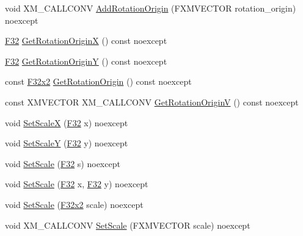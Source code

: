 \begin{DoxyCompactItemize}
\item 
void X\+M\+\_\+\+C\+A\+L\+L\+C\+O\+NV \mbox{\hyperlink{classmage_1_1_sprite_transform_a8f1ce16eb9c07a4f798e93bf58eb2b46}{Add\+Rotation\+Origin}} (F\+X\+M\+V\+E\+C\+T\+OR rotation\+\_\+origin) noexcept
\item 
\mbox{\hyperlink{namespacemage_aa97e833b45f06d60a0a9c4fc22ae02c0}{F32}} \mbox{\hyperlink{classmage_1_1_sprite_transform_a980beb77dc4b64a2d784361d61981f9c}{Get\+Rotation\+OriginX}} () const noexcept
\item 
\mbox{\hyperlink{namespacemage_aa97e833b45f06d60a0a9c4fc22ae02c0}{F32}} \mbox{\hyperlink{classmage_1_1_sprite_transform_a762326097353f1303eede1b716cb9f51}{Get\+Rotation\+OriginY}} () const noexcept
\item 
const \mbox{\hyperlink{namespacemage_a9dc0d34d6ecc87e4cfa4a826102117bc}{F32x2}} \mbox{\hyperlink{classmage_1_1_sprite_transform_a5c538636df465016643a370a9f820865}{Get\+Rotation\+Origin}} () const noexcept
\item 
const X\+M\+V\+E\+C\+T\+OR X\+M\+\_\+\+C\+A\+L\+L\+C\+O\+NV \mbox{\hyperlink{classmage_1_1_sprite_transform_a49349d65ad063a1519b6699087d9b790}{Get\+Rotation\+OriginV}} () const noexcept
\item 
void \mbox{\hyperlink{classmage_1_1_sprite_transform_a2e19b9bffce49955e57094b1eda6af52}{Set\+ScaleX}} (\mbox{\hyperlink{namespacemage_aa97e833b45f06d60a0a9c4fc22ae02c0}{F32}} x) noexcept
\item 
void \mbox{\hyperlink{classmage_1_1_sprite_transform_a98304f37ff1aa359122e9ea08b060415}{Set\+ScaleY}} (\mbox{\hyperlink{namespacemage_aa97e833b45f06d60a0a9c4fc22ae02c0}{F32}} y) noexcept
\item 
void \mbox{\hyperlink{classmage_1_1_sprite_transform_ad11fab7a12f6d1ce79eab12e16adab93}{Set\+Scale}} (\mbox{\hyperlink{namespacemage_aa97e833b45f06d60a0a9c4fc22ae02c0}{F32}} s) noexcept
\item 
void \mbox{\hyperlink{classmage_1_1_sprite_transform_a4f20a52939fc8a7ab285673861d3deae}{Set\+Scale}} (\mbox{\hyperlink{namespacemage_aa97e833b45f06d60a0a9c4fc22ae02c0}{F32}} x, \mbox{\hyperlink{namespacemage_aa97e833b45f06d60a0a9c4fc22ae02c0}{F32}} y) noexcept
\item 
void \mbox{\hyperlink{classmage_1_1_sprite_transform_a9a37baa13eb28bef24c93d7c10fb7188}{Set\+Scale}} (\mbox{\hyperlink{namespacemage_a9dc0d34d6ecc87e4cfa4a826102117bc}{F32x2}} scale) noexcept
\item 
void X\+M\+\_\+\+C\+A\+L\+L\+C\+O\+NV \mbox{\hyperlink{classmage_1_1_sprite_transform_a1e9c60025ebbbaf88fe17af85526f5c8}{Set\+Scale}} (F\+X\+M\+V\+E\+C\+T\+OR scale) noexcept

\end{DoxyCompactItemize}
